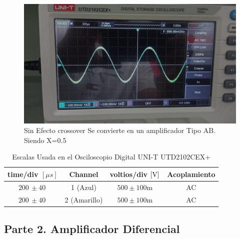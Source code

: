 \begin{enumerate}
\begin{enumerate}
                \begin{figure}[H]
                  \centering
                  \renewcommand{\figurename}{Imagen}
                  \includegraphics[width=\textwidth]{Imagenes/sincrossover.jpg}
                  \caption{Sin Efecto crossover Se convierte en un amplificador Tipo AB. Siendo X=0.5}
                  \label{fig:sincrossover}
                \end{figure}


                \begin{table}[H]
                  \centering
                  \begin{tabular}{|c|c|c|c|}
                    \hline
                    \textbf{time/div} $[\mu s]$ & \textbf{Channel} & \textbf{voltios/div $[\volt]$} & \textbf{Acoplamiento} \\ \hline
                    $200 \, \pm 40 \, $         & 1 (Azul)         & $500 \pm 100 \text{m}  $       & AC                    \\ \hline
                    $200 \, \pm 40 \,   $       & 2 (Amarillo)     & $500  \pm 100 \text{m}   $     & AC                    \\ \hline
                  \end{tabular}
                  \caption{Escalas Usada en el Osciloscopio Digital UNI-T UTD2102CEX+}
                  \label{tab:escala_sincrossover}
                \end{table}
        \end{enumerate}
\end{enumerate}

\subsection{Parte 2. Amplificador Diferencial} \label{subsec:parte2}

